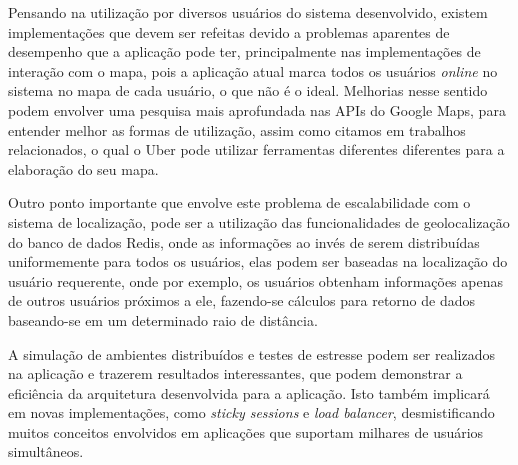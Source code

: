 Pensando na utilização por diversos usuários do sistema desenvolvido, existem implementações que devem ser refeitas devido a problemas aparentes de desempenho que a aplicação pode ter, principalmente nas implementações de interação com o mapa, pois a aplicação atual marca todos os usuários \textit{online} no sistema no mapa de cada usuário, o que não é o ideal. Melhorias nesse sentido podem envolver uma pesquisa mais aprofundada nas APIs do Google Maps, para entender melhor as formas de utilização, assim como citamos em trabalhos relacionados, o qual o Uber pode utilizar ferramentas diferentes diferentes para a elaboração do seu mapa. 

Outro ponto importante que envolve este problema de escalabilidade com o sistema de localização, pode ser a utilização das funcionalidades de geolocalização do banco de dados Redis, onde as informações ao invés de serem distribuídas uniformemente para todos os usuários, elas podem ser baseadas na localização do usuário requerente, onde por exemplo, os usuários obtenham informações apenas de outros usuários próximos a ele, fazendo-se cálculos para retorno de dados baseando-se em um determinado raio de distância.

A simulação de ambientes distribuídos e testes de estresse podem ser realizados na aplicação e trazerem resultados interessantes, que podem demonstrar a eficiência da arquitetura desenvolvida para a aplicação. Isto também implicará em novas implementações, como \textit{sticky sessions} e \textit{load balancer}, desmistificando muitos conceitos envolvidos em aplicações que suportam milhares de usuários simultâneos.
